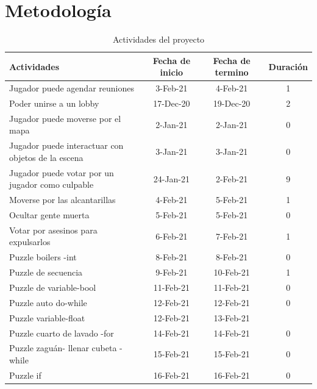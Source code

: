 \section{Metodología}
\begin{longtable}[c]{|m{5cm}|c|c|c|}
\caption{Actividades del proyecto \label{table:fechas_actividades}}\\
\hline
Actividades                                         & Fecha de inicio & Fecha de termino   & Duración \\
\hline
Jugador puede agendar reuniones                    & 3-Feb-21  & 4-Feb-21  & 1      \\
\hline
Poder unirse a un lobby                            & 17-Dec-20 & 19-Dec-20 & 2      \\
\hline
Jugador puede moverse por el mapa                  & 2-Jan-21  & 2-Jan-21  & 0      \\
\hline
Jugador puede interactuar con objetos de la escena & 3-Jan-21  & 3-Jan-21  & 0      \\
\hline
Jugador puede votar por un jugador como culpable   & 24-Jan-21 & 2-Feb-21  & 9      \\
\hline
Moverse por las alcantarillas                      & 4-Feb-21  & 5-Feb-21  & 1      \\
\hline
Ocultar gente muerta                               & 5-Feb-21  & 5-Feb-21  & 0      \\
\hline
Votar por asesinos para expulsarlos                & 6-Feb-21  & 7-Feb-21  & 1      \\
\hline
Puzzle boilers -int                                & 8-Feb-21  & 8-Feb-21  & 0      \\
\hline
Puzzle de secuencia                                & 9-Feb-21  & 10-Feb-21 & 1      \\
\hline
Puzzle de variable-bool                            & 11-Feb-21 & 11-Feb-21 & 0      \\
\hline
Puzzle auto do-while                               & 12-Feb-21 & 12-Feb-21 & 0      \\
\hline
Puzzle variable-float                              & 12-Feb-21 & 13-Feb-21 &        \\
\hline
Puzzle cuarto de lavado -for                       & 14-Feb-21 & 14-Feb-21 & 0      \\
\hline
Puzzle zaguán- llenar cubeta -while                & 15-Feb-21 & 15-Feb-21 & 0      \\
\hline
Puzzle if                                          & 16-Feb-21 & 16-Feb-21 & 0      \\

\end{longtable}
